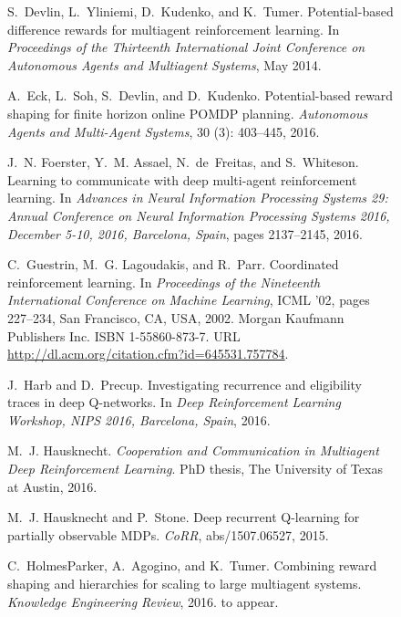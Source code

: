 \documentclass{article}
\begin{document}
\begin{SCfigure}
\begin{thebibliography}{40}
S.~Devlin, L.~Yliniemi, D.~Kudenko, and K.~Tumer.
\newblock Potential-based difference rewards for multiagent reinforcement
  learning.
\newblock In \emph{Proceedings of the Thirteenth International Joint Conference
  on Autonomous Agents and Multiagent Systems}, May 2014.

A.~Eck, L.~Soh, S.~Devlin, and D.~Kudenko.
\newblock Potential-based reward shaping for finite horizon online {POMDP}
  planning.
\newblock \emph{Autonomous Agents and Multi-Agent Systems}, 30
  (3): 403--445, 2016.

J.~N. Foerster, Y.~M. Assael, N.~de~Freitas, and S.~Whiteson.
\newblock Learning to communicate with deep multi-agent reinforcement learning.
\newblock In \emph{Advances in Neural Information Processing Systems 29: Annual
  Conference on Neural Information Processing Systems 2016, December 5-10,
  2016, Barcelona, Spain}, pages 2137--2145, 2016.

C.~Guestrin, M.~G. Lagoudakis, and R.~Parr.
\newblock Coordinated reinforcement learning.
\newblock In \emph{Proceedings of the Nineteenth International Conference on
  Machine Learning}, ICML '02, pages 227--234, San Francisco, CA, USA, 2002.
  Morgan Kaufmann Publishers Inc.
\newblock ISBN 1-55860-873-7.
\newblock URL \url{http://dl.acm.org/citation.cfm?id=645531.757784}.

J.~Harb and D.~Precup.
\newblock Investigating recurrence and eligibility traces in deep {Q-}networks.
\newblock In \emph{Deep Reinforcement Learning Workshop, NIPS 2016, Barcelona,
  Spain}, 2016.

M.~J. Hausknecht.
\newblock \emph{Cooperation and Communication in Multiagent Deep Reinforcement
  Learning}.
\newblock PhD thesis, The University of Texas at Austin, 2016.

M.~J. Hausknecht and P.~Stone.
\newblock Deep recurrent {Q}-learning for partially observable {MDPs}.
\newblock \emph{CoRR}, abs/1507.06527, 2015.

C.~HolmesParker, A.~Agogino, and K.~Tumer.
\newblock Combining reward shaping and hierarchies for scaling to large
  multiagent systems.
\newblock \emph{Knowledge Engineering Review}, 2016.
\newblock to appear.


\end{thebibliography}
\end{SCfigure}
\end{document}

